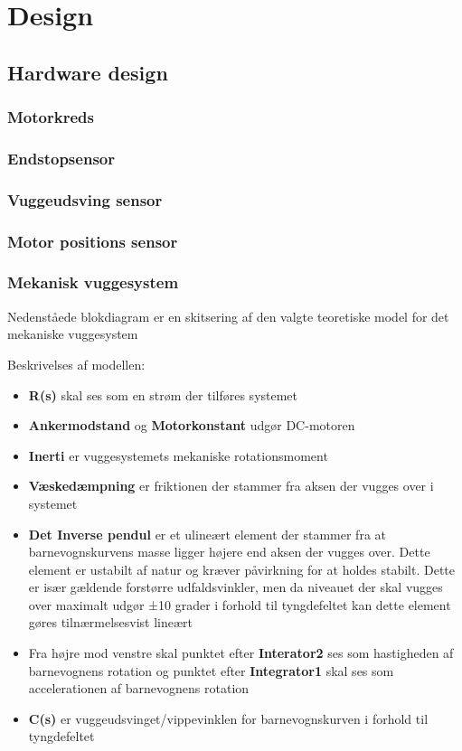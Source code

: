 \section{Design}
\subsection{Hardware design}

\subsubsection{Motorkreds}

\subsubsection{Endstopsensor}

\subsubsection{Vuggeudsving sensor}

\subsubsection{Motor positions sensor}

\subsubsection{Mekanisk vuggesystem}
Nedenståede blokdiagram er en skitsering af den valgte teoretiske model for det mekaniske vuggesystem


Beskrivelses af modellen:
\begin{itemize}
\item \textbf{R(s)} skal ses som en strøm der tilføres systemet
\item \textbf{Ankermodstand} og \textbf{Motorkonstant} udgør DC-motoren
\item \textbf{Inerti} er vuggesystemets mekaniske rotationsmoment
\item \textbf{Væskedæmpning} er friktionen der stammer fra aksen der vugges over i systemet
\item \textbf{Det Inverse pendul} er et ulineært element der stammer fra at barnevognskurvens masse ligger højere end aksen der vugges over. Dette element er ustabilt af natur og kræver påvirkning for at holdes stabilt. Dette er især gældende forstørre udfaldsvinkler, men da niveauet der skal vugges over maximalt udgør ±10 grader i forhold til tyngdefeltet kan dette element gøres tilnærmelsesvist lineært
\item Fra højre mod venstre skal punktet efter \textbf{Interator2} ses som hastigheden af barnevognens rotation og punktet efter \textbf{Integrator1} skal ses som accelerationen af barnevognens rotation
\item \textbf{C(s)} er vuggeudsvinget/vippevinklen for barnevognskurven i forhold til tyngdefeltet

\end{itemize}

